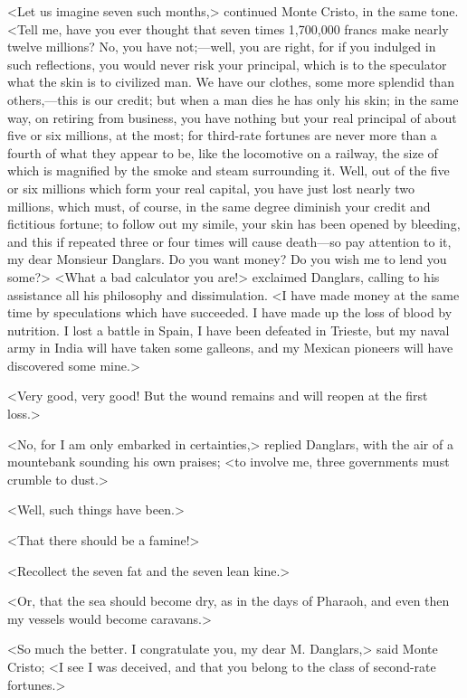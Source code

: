  <Let us imagine seven such months,> continued Monte Cristo, in the same tone. <Tell me, have you ever thought that seven times 1,700,000 francs make nearly twelve millions? No, you have not;—well, you are right, for if you indulged in such reflections, you would never risk your principal, which is to the speculator what the skin is to civilized man. We have our clothes, some more splendid than others,—this is our credit; but when a man dies he has only his skin; in the same way, on retiring from business, you have nothing but your real principal of about five or six millions, at the most; for third-rate fortunes are never more than a fourth of what they appear to be, like the locomotive on a railway, the size of which is magnified by the smoke and steam surrounding it. Well, out of the five or six millions which form your real capital, you have just lost nearly two millions, which must, of course, in the same degree diminish your credit and fictitious fortune; to follow out my simile, your skin has been opened by bleeding, and this if repeated three or four times will cause death—so pay attention to it, my dear Monsieur Danglars. Do you want money? Do you wish me to lend you some?>  <What a bad calculator you are!> exclaimed Danglars, calling to his assistance all his philosophy and dissimulation. <I have made money at the same time by speculations which have succeeded. I have made up the loss of blood by nutrition. I lost a battle in Spain, I have been defeated in Trieste, but my naval army in India will have taken some galleons, and my Mexican pioneers will have discovered some mine.> 

 <Very good, very good! But the wound remains and will reopen at the first loss.> 

 <No, for I am only embarked in certainties,> replied Danglars, with the air of a mountebank sounding his own praises; <to involve me, three governments must crumble to dust.> 

 <Well, such things have been.> 

 <That there should be a famine!> 

 <Recollect the seven fat and the seven lean kine.> 

 <Or, that the sea should become dry, as in the days of Pharaoh, and even then my vessels would become caravans.> 

 <So much the better. I congratulate you, my dear M. Danglars,> said Monte Cristo; <I see I was deceived, and that you belong to the class of second-rate fortunes.> 

